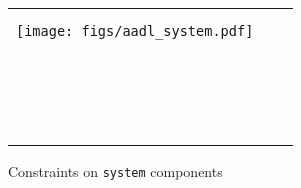 {\begin{figure}[!h]
{\begin{tabular}{|c|l|l|}
{\begin{minipage}{0.3 \textwidth}
Properties: yes\\
\end{minipage}
}
\\
\texttt{[image: figs/aadl\_system.pdf]}&& \\
&&\\
&&\\
&&\\
&&\\
&&\\
&&\\
&&\\
&&\\
&&\\
&&\\
&&\\
&&\\
&&\\
&&\\
&&\\
&&\\
&&\\
\hline
\end{tabular}
}
\caption{Constraints on \texttt{system} components}
\label{cons::system}
\end{figure}
}
